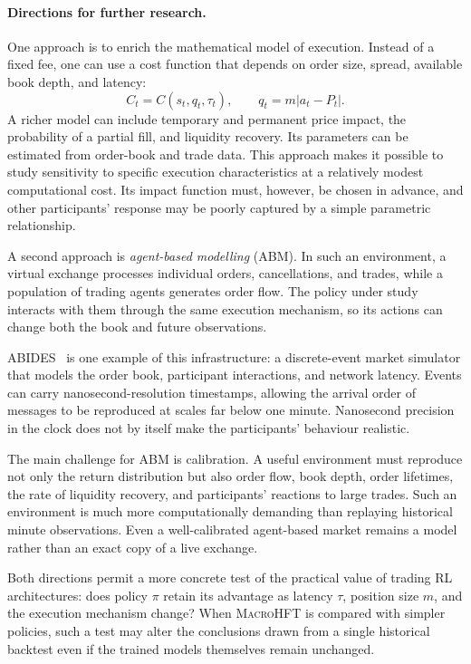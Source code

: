 \documentclass[9pt,a4paper,twocolumn]{extarticle}
\newcommand{\Macro}{\textsc{MacroHFT}}
\begin{document}
\paragraph{Directions for further research.}

One approach is to enrich the mathematical model of execution. Instead of a fixed fee, one can
use a cost function that depends on order size, spread, available book depth, and latency:
\begin{equation}
    C_t
    =
    C(s_t,q_t,\tau_t),
    \qquad
    q_t=m|a_t-P_t|.
    \label{eq:execution_cost_model}
\end{equation}
A richer model can include temporary and permanent price impact, the probability of a partial
fill, and liquidity recovery. Its parameters can be estimated from order-book and trade data.
This approach makes it possible to study sensitivity to specific execution characteristics at a
relatively modest computational cost. Its impact function must, however, be chosen in advance,
and other participants' response may be poorly captured by a simple parametric relationship.

A second approach is \emph{agent-based modelling} (ABM). In such an environment, a virtual
exchange processes individual orders, cancellations, and trades, while a population of trading
agents generates order flow. The policy under study interacts with them through the same
execution mechanism, so its actions can change both the book and future observations.

ABIDES~\cite{byrd2020abides} is one example of this infrastructure: a discrete-event market
simulator that models the order book, participant interactions, and network latency. Events can
carry nanosecond-resolution timestamps, allowing the arrival order of messages to be reproduced
at scales far below one minute. Nanosecond precision in the clock does not by itself make the
participants' behaviour realistic.

The main challenge for ABM is calibration. A useful environment must reproduce not only the
return distribution but also order flow, book depth, order lifetimes, the rate of liquidity
recovery, and participants' reactions to large trades. Such an environment is much more
computationally demanding than replaying historical minute observations. Even a well-calibrated
agent-based market remains a model rather than an exact copy of a live exchange.

Both directions permit a more concrete test of the practical value of trading RL architectures:
does policy $\pi$ retain its advantage as latency $\tau$, position size $m$, and the execution
mechanism change? When \Macro{} is compared with simpler policies, such a test may alter the
conclusions drawn from a single historical backtest even if the trained models themselves remain
unchanged.
\end{document}
